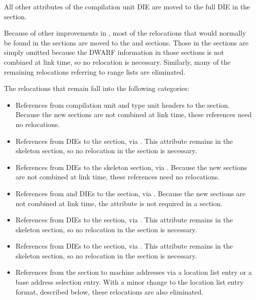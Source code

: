 All other attributes of the compilation unit DIE are moved to
the full DIE in the \dotdebuginfodwo{} section.

Because of other improvements in \DWARFVersionV, most of the
relocations that would normally be found in the \dotdebuginfodwo{}
sections are moved to the \dotdebugaddr{} and
\dotdebugstroffsetsdwo{} sections. Those in the
\dotdebugstroffsetsdwo{} sections are simply omitted because the
DWARF information in those sections is not combined at link
time, so no relocation is necessary. Similarly,
many of the remaining relocations referring to range lists are
eliminated. 

The relocations that remain fall into the following categories:
\begin{itemize}
\item
References from compilation unit and type unit headers to the
\dotdebugabbrevdwo{} section. Because the new sections are not
combined at link time, these references need no relocations.
\item
References from \DWTAGcompileunit{} DIEs to the
\dotdebuglinedwo{} section, via \DWATstmtlist{}. This attribute
remains in the skeleton \dotdebuginfo{} section, so no
relocation in the \dotdebuginfodwo{} section is necessary.
\item
References from \DWTAGtypeunit{} DIEs to the skeleton
\dotdebuglinedwo{} section, via \DWATstmtlist{}. Because the new
sections are not combined at link time, these references need
no relocations.
\item
References from \DWTAGcompileunit{} and \DWTAGtypeunit{} DIEs
to the \dotdebugstroffsetsdwo{} section, via
\DWATstroffsetsbase{}. Because the new sections are not
combined at link time, the \DWATstroffsetsbase{} attribute
is not required in a \dotdebuginfodwo{}
section.
\item
References from \DWTAGcompileunit{} DIEs to the \dotdebugaddr{}
section, via \DWATaddrbase{}. This attribute remains in
the skeleton \dotdebuginfo{} section, so no relocation in the
\dotdebuginfodwo{} section is necessary.
\item
References from \DWTAGcompileunit{} DIEs to the \dotdebugranges{}
section, via \DWATrangesbase{}. This attribute remains in
the skeleton \dotdebuginfo{} section, so no relocation in the
\dotdebuginfodwo{} section is necessary.
\item
References from the \dotdebuglocdwo{} section to machine addresses
via a location list entry or a base address selection entry.
With a minor change to the location list entry format,
described below, these relocations are also eliminated.
\end{itemize}

